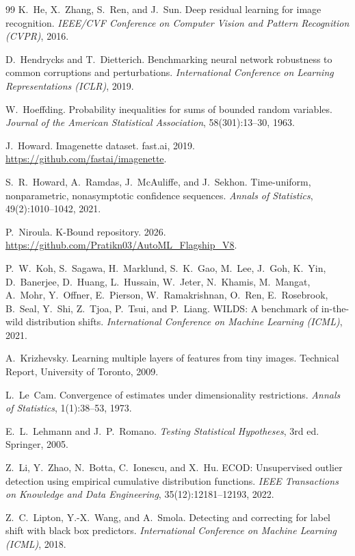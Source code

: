 \begin{thebibliography}{99}
K.~He, X.~Zhang, S.~Ren, and J.~Sun.
Deep residual learning for image recognition.
\textit{IEEE/CVF Conference on Computer Vision and Pattern Recognition (CVPR)}, 2016.

D.~Hendrycks and T.~Dietterich.
Benchmarking neural network robustness to common corruptions and
perturbations.
\textit{International Conference on Learning Representations (ICLR)}, 2019.

W.~Hoeffding.
Probability inequalities for sums of bounded random variables.
\textit{Journal of the American Statistical Association}, 58(301):13--30, 1963.

J.~Howard.
Imagenette dataset.
fast.ai, 2019.
\url{https://github.com/fastai/imagenette}.

S.~R.~Howard, A.~Ramdas, J.~McAuliffe, and J.~Sekhon.
Time-uniform, nonparametric, nonasymptotic confidence sequences.
\textit{Annals of Statistics}, 49(2):1010--1042, 2021.

P.~Niroula.
K-Bound repository.
2026.
\url{https://github.com/Pratikn03/AutoML_Flagship_V8}.

P.~W.~Koh, S.~Sagawa, H.~Marklund, S.~K.~Gao, M.~Lee, J.~Goh, K.~Yin,
D.~Banerjee, D.~Huang, L.~Hussain, W.~Jeter, N.~Khamis, M.~Mangat,
A.~Mohr, Y.~Offner, E.~Pierson, W.~Ramakrishnan, O.~Ren, E.~Rosebrook,
B.~Seal, Y.~Shi, Z.~Tjoa, P.~Tsui, and P.~Liang.
WILDS: A benchmark of in-the-wild distribution shifts.
\textit{International Conference on Machine Learning (ICML)}, 2021.

A.~Krizhevsky.
Learning multiple layers of features from tiny images.
Technical Report, University of Toronto, 2009.

L.~Le~Cam.
Convergence of estimates under dimensionality restrictions.
\textit{Annals of Statistics}, 1(1):38--53, 1973.

E.~L.~Lehmann and J.~P.~Romano.
\textit{Testing Statistical Hypotheses}, 3rd ed.
Springer, 2005.

Z.~Li, Y.~Zhao, N.~Botta, C.~Ionescu, and X.~Hu.
ECOD: Unsupervised outlier detection using empirical cumulative
distribution functions.
\textit{IEEE Transactions on Knowledge and Data Engineering}, 35(12):12181--12193, 2022.

Z.~C.~Lipton, Y.-X.~Wang, and A.~Smola.
Detecting and correcting for label shift with black box predictors.
\textit{International Conference on Machine Learning (ICML)}, 2018.


\end{thebibliography}
